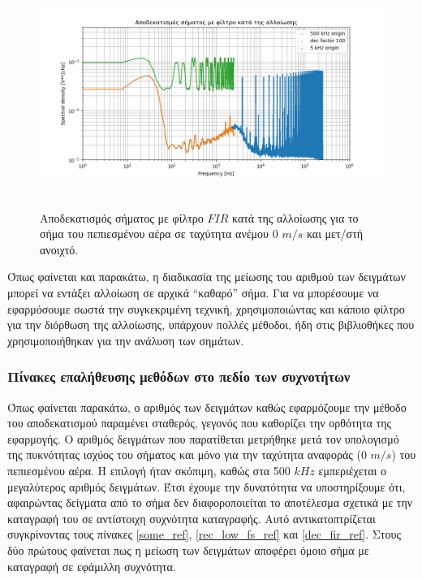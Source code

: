 \documentclass[breaklines=true, 12pt]{article}
\begin{document}
{{{\begin{figure}[htbp]
\centering
\includegraphics[width=500px,height=280px]{./decimation/anti_aliasing_fir.png}
\caption{\label{without_al}Αποδεκατισμός σήματος με φίλτρο \(FIR\) κατά της αλλοίωσης για το σήμα του πεπιεσμένου αέρα σε ταχύτητα ανέμου 0 \(m/s\) και μετ/στή ανοιχτό.}
\end{figure}

Όπως φαίνεται και παρακάτω, η διαδικασία της μείωσης του αριθμού των
δειγμάτων μπορεί να εντάξει αλλοίωση σε αρχικά “καθαρό” σήμα. Για να
μπορέσουμε να εφαρμόσουμε σωστά την συγκεκριμένη τεχνική, χρησιμοποιώντας
και κάποιο φίλτρο για την διόρθωση της αλλοίωσης, υπάρχουν πολλές μέθοδοι,
ήδη στις βιβλιοθήκες που χρησιμοποιήθηκαν για την ανάλυση των σημάτων.
\subsubsection{\textbf{Πίνακες επαλήθευσης μεθόδων στο πεδίο των συχνοτήτων}}
\label{sec:org41315a6}

Όπως φαίνεται παρακάτω, ο αριθμός των δειγμάτων καθώς
εφαρμόζουμε την μέθοδο του αποδεκατισμού παραμένει σταθερός, γεγονός που
καθορίζει την ορθότητα της εφαρμογής. Ο αριθμός δειγμάτων που παρατίθεται
μετρήθηκε μετά τον υπολογισμό της πυκνότητας ισχύος του σήματος και μόνο
για την ταχύτητα αναφοράς (0 \(m/s\)) του πεπιεσμένου αέρα. Η επιλογή
ήταν σκόπιμη, καθώς στα 500 \(kHz\) εμπεριέχεται ο μεγαλύτερος αριθμός
δειγμάτων. Έτσι έχουμε την δυνατότητα να υποστηρίξουμε ότι, αφαιρώντας
δείγματα από το σήμα δεν διαφοροποιείται το αποτέλεσμα σχετικά με την
καταγραφή του σε αντίστοιχη συχνότητα καταγραφής. Αυτό αντικατοπτρίζεται
συγκρίνοντας τους πίνακες \ref{some_ref}, \ref{rec_low_fs_ref} και \ref{dec_fir_ref}. Στους
δύο πρώτους φαίνεται πως η μείωση των δειγμάτων αποφέρει όμοιο σήμα με
καταγραφή σε εφάμιλλη συχνότητα.

}}}
\end{document}
